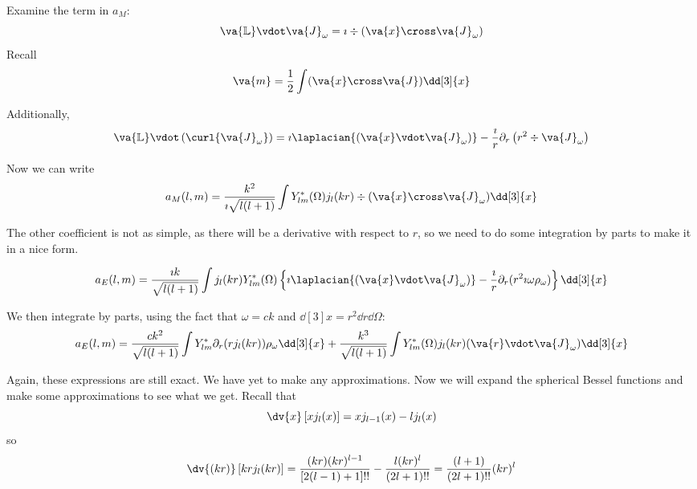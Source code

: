 \documentclass[a4paper,twoside,master.tex]{subfiles}
\begin{document}
Examine the term in $ a_M $:
\begin{equation}
    \va{\mathbb{L}}\vdot \va{J}_{\omega} = \imath \div{( \va{x} \cross \va{J}_{\omega})}
\end{equation}
Recall
\begin{equation}
    \va{m} = \frac{1}{2} \int ( \va{x} \cross \va{J}) \dd[3]{x}
\end{equation}

Additionally,
\begin{equation}
    \va{\mathbb{L}} \vdot \left( \curl{ \va{J}_{\omega}}  \right) = \imath \laplacian{( \va{x} \vdot \va{J}_{\omega})} - \frac{\imath}{r} \partial_r \left( r^2 \div{ \va{J}_{\omega}} \right)
\end{equation}

Now we can write
\begin{equation}
    a_M(l,m) = \frac{k^2}{\imath \sqrt{l(l+1)}} \int Y_{lm}^*(\Omega) j_l(kr) \div{( \va{x} \cross \va{J}_{\omega})} \dd[3]{x}
\end{equation}

The other coefficient is not as simple, as there will be a derivative with respect to $ r $, so we need to do some integration by parts to make it in a nice form.

\begin{equation}
    a_E(l,m) = \frac{\imath k}{\sqrt{l(l+1)}} \int j_l(kr) Y_{lm}^*(\Omega) \left\{ \imath \laplacian{( \va{x} \vdot \va{J}_{\omega})} - \frac{\imath}{r} \partial_r (r^2 \imath \omega \rho_{\omega}) \right\} \dd[3]{x}
\end{equation}

We then integrate by parts, using the fact that $ \omega = ck $ and $ \dd[3]{x} = r^2 \dd{r} \dd{\Omega} $:
\begin{equation}
    a_E(l,m) = \frac{ck^2}{\sqrt{l(l+1)}} \int Y_{lm}^* \partial_r(r j_l(kr)) \rho_{\omega} \dd[3]{x} + \frac{k^3}{\sqrt{l(l+1)}} \int Y_{lm}^*(\Omega) j_l(kr) ( \va{r} \vdot \va{J}_{\omega}) \dd[3]{x}
\end{equation}

Again, these expressions are still exact. We have yet to make any approximations. Now we will expand the spherical Bessel functions and make some approximations to see what we get. Recall that
\begin{equation}
    \dv{x} \left[ x j_l(x) \right] = x j_{l-1}(x) - l j_l(x)
\end{equation}
so
\begin{equation}
    \dv{(kr)}\left[ kr j_l(kr) \right] = \frac{(kr)(kr)^{l-1}}{[2(l-1)+1]!!} - \frac{l(kr)^{l}}{(2l+1)!!} = \frac{(l+1)}{(2l+1)!!} (kr)^{l}
\end{equation}
\end{document}
